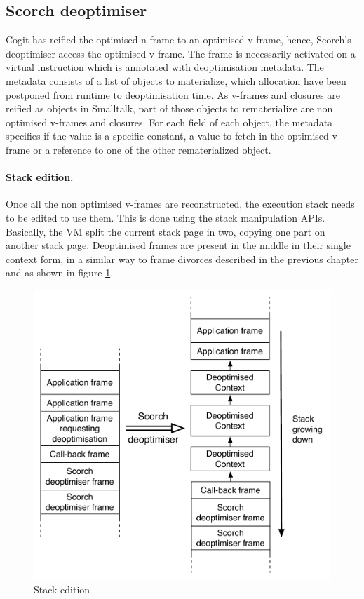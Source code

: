 \documentclass[a4paper,12pt,twoside]{../includes/ThesisStyle}
\begin{document}
\subsection{Scorch deoptimiser}

Cogit has reified the optimised n-frame to an optimised v-frame, hence, Scorch's deoptimiser access the optimised v-frame. The frame is necessarily activated on a virtual instruction which is annotated with deoptimisation metadata. The metadata consists of a list of objects to materialize, which allocation have been postponed from runtime to deoptimisation time. As v-frames and closures are reified as objects in Smalltalk, part of those objects to rematerialize are non optimised v-frames and closures. For each field of each object, the metadata specifies if the value is a specific constant, a value to fetch in the optimised v-frame or a reference to one of the other rematerialized object.

\paragraph{Stack edition.}

Once all the non optimised v-frames are reconstructed, the execution stack needs to be edited to use them. This is done using the stack manipulation APIs. Basically, the VM split the current stack page in two, copying one part on another stack page. Deoptimised frames are present in the middle in their single context form, in a similar way to frame divorces described in the previous chapter and as shown in figure \ref{fig:DeoptStacks}.

\begin{figure}[h!]
    \begin{center}
		\includegraphics[width=0.80\linewidth]{DeoptStacks}
        \caption{Stack edition}
        \label{fig:DeoptStacks}
    \end{center}
\end{figure}
\end{document}
